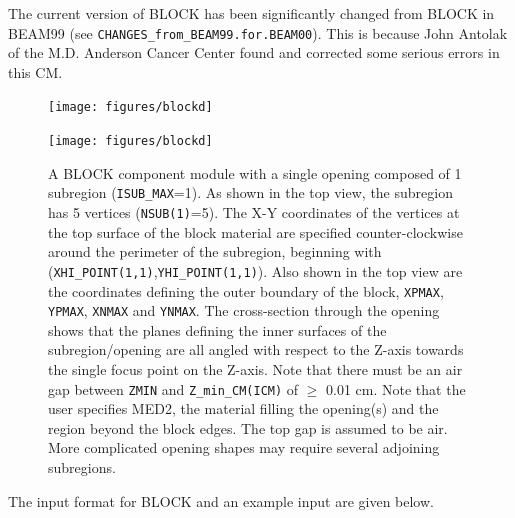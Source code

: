 \documentclass[12pt,twoside]{article}
\begin{document}
The current version of BLOCK has been significantly changed from
BLOCK in BEAM99 (see {\tt CHANGES\_from\_BEAM99.for.BEAM00}).  This
is because John Antolak of the M.D. Anderson Cancer Center found and
corrected some serious errors in this CM.

\begin{figure}[htp]
\begin{center}
\leavevmode
\begin{latexonly}
\texttt{[image: figures/blockd]}
\end{latexonly}
\begin{htmlonly}
\texttt{[image: figures/blockd]}
\end{htmlonly}
\end{center}
\vspace{1cm}
\caption[BLOCK CM geometry]
{A BLOCK component module with a single opening composed of 1
subregion ({\tt ISUB\_MAX}=1).  As shown in the top view, the subregion
has 5 vertices ({\tt NSUB(1)}=5).  The X-Y coordinates of the vertices
at the top surface of the block material are specified counter-clockwise
around the perimeter of the subregion, beginning with
({\tt XHI\_POINT(1,1)},{\tt YHI\_POINT(1,1)}).  Also shown in the top
view are the coordinates defining the outer boundary of the block,
{\tt XPMAX}, {\tt YPMAX}, {\tt XNMAX} and {\tt YNMAX}.
The cross-section through
the opening shows that the planes defining the inner surfaces of the
subregion/opening are all angled with respect to the Z-axis towards the
single focus point on the Z-axis.  Note that there must be an air gap
between {\tt ZMIN} and {\tt Z\_min\_CM(ICM)} of $\geq$ 0.01 cm.  Note that
the user specifies MED2, the material filling the opening(s) and the region
beyond the block edges.
The top gap is assumed to be air.  More complicated
opening shapes may require several adjoining subregions.}
\label{fig_BLOCKD}
\end{figure}


\clearpage
The input format for BLOCK and an example input are given below.
\begin{small}

\end{small}




\clearpage

\end{document}
